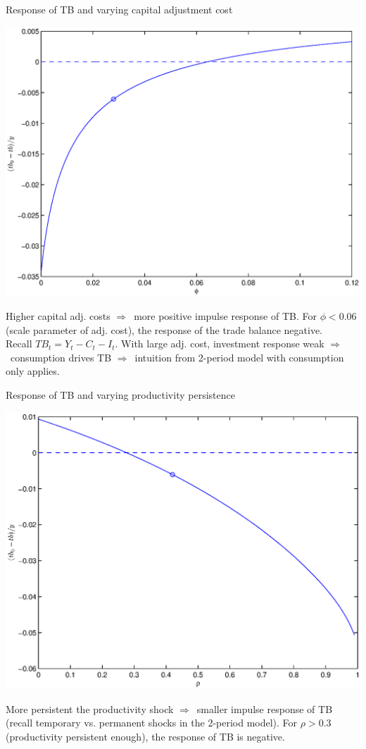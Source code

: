 \documentclass{beamer}
\newcommand{\rarr}{$\Rightarrow$\ }
\begin{document}
\begin{frame}{Response of TB and varying capital adjustment cost}

\begin{center}
\includegraphics[width = 0.7\linewidth]{FIGURES/soe_rbc_irtbys_phi_slides.eps} 
\end{center}
\vspace{-0.5cm}
Higher capital adj. costs \rarr more positive impulse response of TB. For $\phi<0.06$ (scale parameter of adj. cost), the response of the trade balance negative.
\\
Recall $TB_t = Y_t - C_t - I_t$. With large adj. cost, investment response weak \rarr consumption drives TB \rarr intuition from 2-period model with consumption only applies.

\end{frame}


\begin{frame}{Response of TB and varying productivity persistence}

\begin{center}
\includegraphics[width = 0.7\linewidth]{FIGURES/soe_rbc_irtbys_rho_slides.eps} 
\end{center}
\vspace{-0.5cm}
More persistent the productivity shock \rarr smaller impulse response of TB (recall temporary vs. permanent shocks in the 2-period model). For $\rho>0.3$ (productivity persistent enough), the response of TB is negative.

\end{frame}
\end{document}
